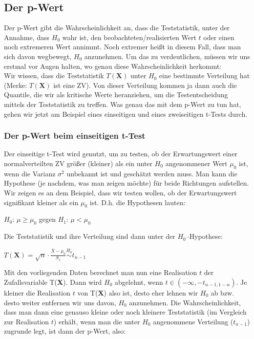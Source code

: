 \documentclass[a4paper]{article}
\newcommand{\simtext}[1]{\ensuremath{\stackrel{\text{#1}}{\sim}}}
\begin{document}
\subsection{Der p-Wert}\label{sec:pWert}

Der p-Wert gibt die Wahrscheinlichkeit an, dass die Teststatistik, unter der Annahme, dass $H_0$ wahr ist, den beobachteten/realisierten Wert $t$ oder einen noch extremeren Wert annimmt. Noch extremer heißt in diesem Fall, dass man sich davon wegbewegt, $H_0$ anzunehmen. Um das zu verdeutlichen, müssen wir uns erstmal vor Augen halten, wo genau diese Wahrscheinlichkeit herkommt: \\

\noindent Wir wissen, dass die Teststatistik $T(\textbf{X})$ unter $H_0$ eine bestimmte Verteilung hat (Merke: $T(\textbf{X})$ ist eine ZV). Von dieser Verteilung kommen ja dann auch die Quantile, die wir als kritische Werte heranziehen, um die Testentscheidung mittels der Teststatistik zu treffen. Was genau das mit dem p-Wert zu tun hat, gehen wir jetzt am Beispiel eines einseitigen und eines zweiseitigen t-Tests durch.

\subsubsection{Der p-Wert beim einseitigen t-Test}\label{sec:pWert1}

Der einseitige t-Test wird genutzt, um zu testen, ob der Erwartungswert einer normalverteilten ZV größer (kleiner) als ein unter $H_0$ angenommener Wert $\mu_0$ ist, wenn die Varianz $\sigma^2$ unbekannt ist und geschätzt werden muss.  Man kann die Hypothese (je nachdem, was man zeigen möchte) für beide Richtungen aufstellen. Wir zeigen es an dem Beispiel, dass wir testen wollen, ob der Erwartungswert signifikant kleiner als ein $\mu_0$ ist. D.h. die Hypothesen lauten: \\
\begin{center} $H_0$: $\mu \geq \mu_0$ \hspace{2cm }gegen \hspace{2cm } $H_1$: $\mu < \mu_0$ \end{center}
Die Teststatistik und ihre Verteilung sind dann unter der $H_0$--Hypothese:\\
\begin{center} $T(\textbf{X})=\sqrt{n}\cdot\frac{\overline{X}-\mu_0}{S_x} \simtext{$H_0$} t_{n-1}$ \end{center}

\noindent Mit den vorliegenden Daten berechnet man nun eine Realisation $t$ der Zufallsvariable T(\textbf{X}). Dann wird $H_0$ abgelehnt, wenn $t \in (-\infty, -t_{n-1,1-\alpha})$. Je kleiner die Realisation $t$ von T(\textbf{X}) also ist, desto eher lehnen wir $H_0$ ab bzw. desto weiter entfernen wir uns davon, $H_0$ anzunehmen. Die Wahrscheinlichkeit, dass man dann eine genauso kleine oder noch kleinere Teststatistik (im Vergleich zur Realisation $t$) erhält, wenn man die unter $H_0$ angenommene Verteilung ($t_{n-1}$) zugrunde legt, ist dann der p-Wert, also:
\end{document}
